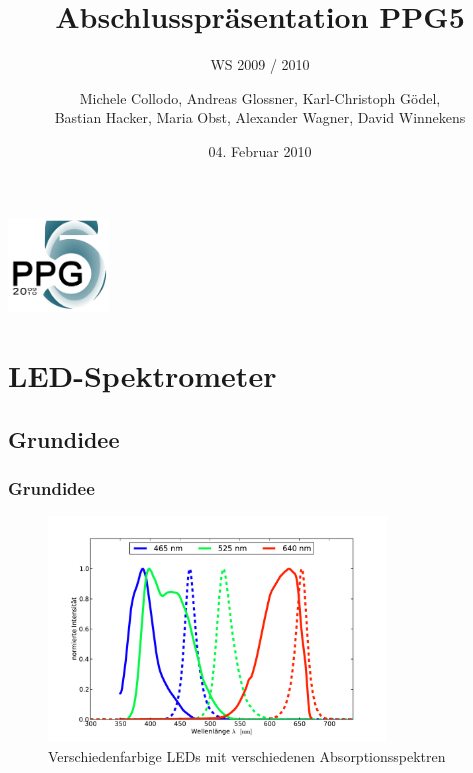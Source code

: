 \documentclass[10pt]{beamer}
\title[Abschlusspr\"asentation]{Abschlusspr\"asentation PPG5}
\subtitle{WS 2009 / 2010}
\author[PPG5]{Michele Collodo, Andreas Glossner, Karl-Christoph G\"odel,\\Bastian Hacker, Maria Obst, Alexander Wagner, David Winnekens}
\date{04. Februar 2010}
\begin{document}
\frame
{
\hfill
\includegraphics[width=0.20\textwidth]{images/ppg5logocrop.pdf}
\titlepage
}

\section{LED-Spektrometer}
\subsection[]{Grundidee}
\frame
{
\frametitle{Grundidee}
\begin{figure}
\begin{center}
\includegraphics[width=0.8\textwidth]{./images/absorp-emit.pdf}
\caption{Verschiedenfarbige LEDs mit verschiedenen Absorptionsspektren}
\end{center}
\end{figure}
}
\end{document}
